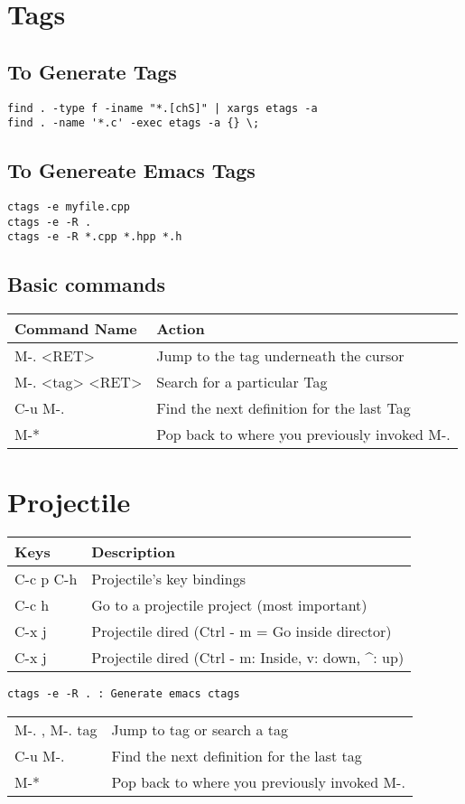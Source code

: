 \documentclass[11pt]{article}
\begin{document}
\section{Tags}
\label{sec:org027395a}
\subsection{To Generate Tags}
\label{sec:orgdd04bab}
\begin{verbatim}
find . -type f -iname "*.[chS]" | xargs etags -a
find . -name '*.c' -exec etags -a {} \;
\end{verbatim}
\subsection{To Genereate Emacs Tags}
\label{sec:orga4d9bef}
\begin{verbatim}
ctags -e myfile.cpp
ctags -e -R .
ctags -e -R *.cpp *.hpp *.h
\end{verbatim}

\subsection{Basic commands}
\label{sec:orgcb04120}

\begin{center}
\begin{tabular}{ll}
\hline
Command Name & Action\\
\hline
M-. <RET> & Jump to the tag underneath the cursor\\
M-. <tag> <RET> & Search for a particular Tag\\
C-u M-. & Find the next definition for the last Tag\\
M-* & Pop back to where you previously invoked M-.\\
\hline
\end{tabular}
\end{center}

\section{Projectile}
\label{sec:org81cbc25}
\begin{center}
\begin{tabular}{ll}
\hline
Keys & Description\\
\hline
C-c p C-h & Projectile's key bindings\\
C-c h & Go to a projectile project (most important)\\
C-x j & Projectile dired (Ctrl - m = Go inside director)\\
\hline
C-x j & Projectile dired (Ctrl - m: Inside, v: down, \^{}: up)\\
\hline
\end{tabular}
\end{center}

\begin{verbatim}
ctags -e -R . : Generate emacs ctags
\end{verbatim}
\begin{center}
\begin{tabular}{ll}
\hline
M-. , M-. tag & Jump to tag or search a tag\\
C-u M-. & Find the next definition for the last tag\\
M-* & Pop back to where you previously invoked M-.\\
\hline
\end{tabular}
\end{center}
\end{document}
